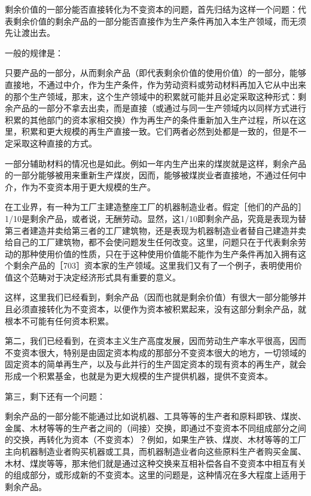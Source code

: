 剩余价值的一部分能否直接转化为不变资本的问题，首先归结为这样一个问题：代表剩余价值的剩余产品的一部分能否直接作为生产条件再加入本生产领域，而无须先让渡出去。

一般的规律是：

只要产品的一部分，从而剩余产品（即代表剩余价值的使用价值）的一部分，能够直接地，不通过中介，作为生产条件，作为劳动资料或劳动材料再加入它从中出来的那个生产领域，那末，这个生产领域中的积累就可能并且必定采取这种形式：剩余产品的一部分不拿去出卖，而是直接（或通过与同一生产领域内以同样方式进行积累的其他部门的资本家相交换）作为再生产的条件重新加入生产过程，所以在这里，积累和更大规模的再生产直接一致。它们两者必然到处都是一致的，但是不一定采取这种直接的方式。

一部分辅助材料的情况也是如此。例如一年内生产出来的煤炭就是这样，剩余产品的一部分能够被用来重新生产煤炭，因而，能够被煤炭业者直接地，不通过任何中介，作为不变资本用于更大规模的生产。

在工业界，有一种为工厂主建造整座工厂的机器制造业者。假定［他们的产品的］1/10是剩余产品，或者说，无酬劳动。显然，这1/10即剩余产品，究竟是表现为替第三者建造并卖给第三者的工厂建筑物，还是表现为机器制造业者替自己建造并卖给自己的工厂建筑物，都不会使问题发生任何改变。这里，问题只在于代表剩余劳动的那种使用价值的性质，只在于这种使用价值能不能作为生产条件再加入拥有这个剩余产品的［703］资本家的生产领域。这里我们又有了一个例子，表明使用价值这个范畴对于决定经济形式具有重要的意义。

这样，这里我们已经看到，剩余产品（因而也就是剩余价值）有很大一部分能够并且必须直接转化为不变资本，以便作为资本被积累起来，没有这部分剩余产品，就根本不可能有任何资本积累。

第二，我们已经看到，在资本主义生产高度发展，因而劳动生产率水平很高，因而不变资本很大，特别是由固定资本构成的那部分不变资本很大的地方，一切领域的固定资本的简单再生产，以及与此并行的生产固定资本的现有资本的再生产，就会形成一个积累基金，也就是为更大规模的生产提供机器，提供不变资本。

第三，剩下还有一个问题：

剩余产品的一部分能不能通过比如说机器、工具等等的生产者和原料即铁、煤炭、金属、木材等等的生产者之间的（间接）交换，即通过不变资本不同组成部分之间的交换，再转化为资本（不变资本）？例如，如果生产铁、煤炭、木材等等的工厂主向机器制造业者购买机器或工具，而机器制造业者向这些原料生产者购买金属、木材、煤炭等等，那末他们就是通过这种交换来互相补偿各自不变资本中相互有关的组成部分，或形成新的不变资本。这里的问题是，这种情况在多大程度上适用于剩余产品。


